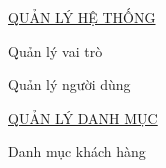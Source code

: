 \underline{\textsc{QUẢN LÝ HỆ THỐNG}}





























Quản lý vai trò



















Quản lý người dùng



















\underline{\textsc{QUẢN LÝ DANH MỤC}}





























Danh mục khách hàng



















